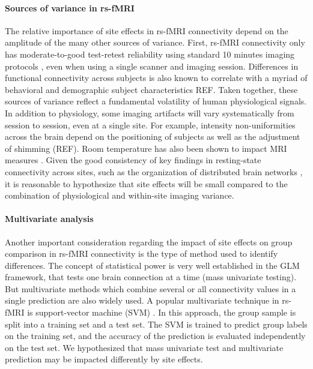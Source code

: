 \documentclass[authoryear]{elsarticle}
\begin{document}
\paragraph{Sources of variance in rs-fMRI}
The relative importance of site effects in rs-fMRI connectivity depend on the amplitude of the many other sources of variance. First, rs-fMRI connectivity only has moderate-to-good test-retest reliability using standard 10 minutes imaging protocols \citep{Shehzad2009}, even when using a single scanner and imaging session. Differences in functional connectivity across subjects is also known to correlate with a myriad of behavioral and demographic subject characteristics REF. Taken together, these sources of variance reflect a fundamental volatility of human physiological signals. In addition to physiology, some imaging artifacts will vary systematically from session to session, even at a single site. For example, intensity non-uniformities across the brain depend on the positioning of subjects as well as the adjustment of shimming (REF). Room temperature has also been shown to impact MRI measures \citep{Vanhoutte2006}. Given the good consistency of key findings in resting-state connectivity across sites, such as the organization of distributed brain networks \citep{Biswal2010}, it is reasonable to hypothesize that site effects will be small compared to the combination of physiological and within-site imaging variance.

\paragraph{Multivariate analysis}
Another important consideration regarding the impact of site effects on group comparison in rs-fMRI connectivity is the type of method used to identify differences. The concept of statistical power is very well established in the GLM framework, that tests one brain connection at a time (mass univariate testing). But multivariate methods which combine several or all connectivity values in a single prediction are also widely used. A popular multivariate technique in rs-fMRI is support-vector machine (SVM) \citep{Cortes1995}. In this approach, the group sample is split into a training set and a test set. The SVM is trained to predict group labels on the training set, and the accuracy of the prediction is evaluated independently on the test set. We hypothesized that mass univariate test and multivariate prediction may be impacted differently by site effects. 
\end{document}
